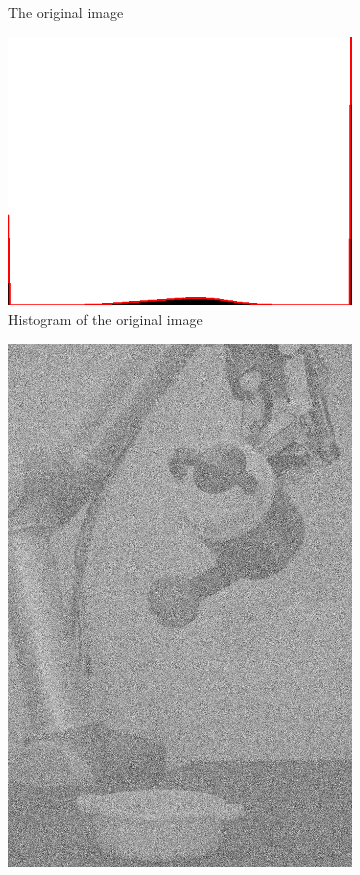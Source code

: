 \begin{figure}[H]
\begin{subfigure}[b]{0.16\textwidth}
        \caption{The original image}
        \label{fig:img2_src}
    \end{subfigure}
    \begin{subfigure}[b]{0.16\textwidth}
        \includegraphics[width=\textwidth]{img2/hist.png}
        \caption{Histogram of the original image}
        \label{fig:img2_hist}
    \end{subfigure}	
\begin{subfigure}[b]{0.16\textwidth}
        \includegraphics[width=\textwidth]{img2/src.png}

\end{subfigure}
\end{figure}
